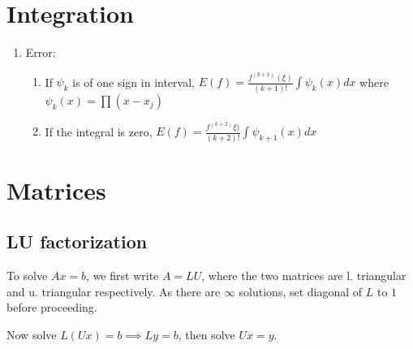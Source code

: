 \documentclass[12pt]{article}
\begin{document}
\section{Integration}
\begin{enumerate}
\item Error: \begin{enumerate}
\item  If $\psi_k$ is of one sign in interval, $E(f)=\frac{f^{(k+1)}(\xi)}{(k+1)!}\int \psi_k(x)dx$ where $\psi_k(x)=\prod (x-x_j)$
\item If the integral is zero,  $E(f)=\frac{f^{(k+2)}\xi)}{(k+2)!}\int \psi_{k+1}(x)dx$
\end{enumerate}
\end{enumerate}
\section{Matrices}
\subsection{LU factorization}
To solve $Ax=b$, we first write $A=LU$, where the two matrices are l. triangular and u. triangular respectively. As there are $\infty$ solutions, set diagonal of $L$ to $1$ before proceeding.

Now solve $L(Ux)=b\implies Ly=b$, then solve $Ux=y$.
\end{document}
